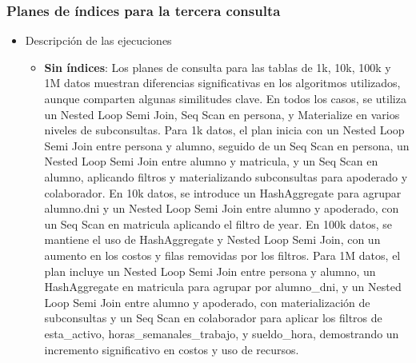 \subsubsection{Planes de índices para la tercera consulta}
\begin{itemize}
	\item{Descripción de las ejecuciones}
	      \begin{itemize}
		      \item {\textbf{Sin índices}: Los planes de consulta para las tablas de 1k, 10k, 100k y 1M datos muestran diferencias significativas en los algoritmos utilizados, aunque comparten algunas similitudes clave. En todos los casos, se utiliza un Nested Loop Semi Join, Seq Scan en persona, y Materialize en varios niveles de subconsultas. Para 1k datos, el plan inicia con un Nested Loop Semi Join entre persona y alumno, seguido de un Seq Scan en persona, un Nested Loop Semi Join entre alumno y matricula, y un Seq Scan en alumno, aplicando filtros y materializando subconsultas para apoderado y colaborador. En 10k datos, se introduce un HashAggregate para agrupar alumno.dni y un Nested Loop Semi Join entre alumno y apoderado, con un Seq Scan en matricula aplicando el filtro de year. En 100k datos, se mantiene el uso de HashAggregate y Nested Loop Semi Join, con un aumento en los costos y filas removidas por los filtros. Para 1M datos, el plan incluye un Nested Loop Semi Join entre persona y alumno, un HashAggregate en matricula para agrupar por alumno\_dni, y un Nested Loop Semi Join entre alumno y apoderado, con materialización de subconsultas y un Seq Scan en colaborador para aplicar los filtros de esta\_activo, horas\_semanales\_trabajo, y sueldo\_hora, demostrando un incremento significativo en costos y uso de recursos.}

\end{itemize}
\end{itemize}
